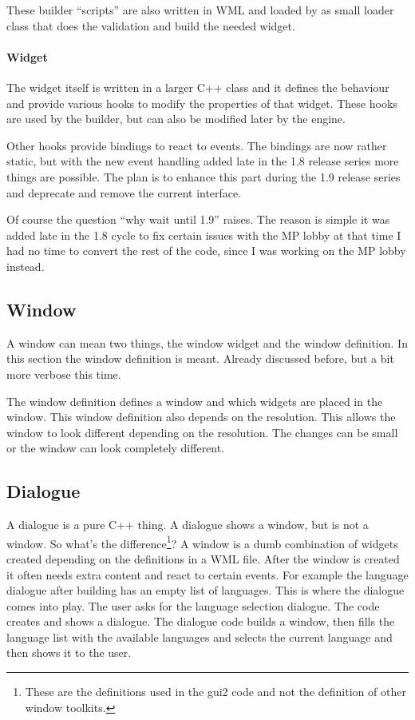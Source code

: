 \documentclass[a4paper,notitlepage]{report}
\begin{document}
These builder ``scripts'' are also written in WML and loaded by as small loader
class that does the validation and build the needed widget.

\paragraph{Widget}
The widget itself is written in a larger C++ class and it defines the behaviour
and provide various hooks to modify the properties of that widget. These hooks
are used by the builder, but can also be modified later by the engine.

Other hooks provide bindings to react to events. The bindings are now rather
static, but with the new event handling added late in the 1.8 release series
more things are possible. The plan is to enhance this part during the 1.9
release series and deprecate and remove the current interface.

Of course the question ``why wait until 1.9'' raises. The reason is simple it
was added late in the 1.8 cycle to fix certain issues with the MP lobby at that
time I had no time to convert the rest of the code, since I was working on the
MP lobby instead.

\subsection{Window}

A window can mean two things, the window widget and the window definition. In
this section the window definition is meant. Already discussed before, but a bit
more verbose this time.

The window definition defines a window and which widgets are placed in the
window. This window definition also depends on the resolution. This allows the
window to look different depending on the resolution. The changes can be small
or the window can look completely different.

\subsection{Dialogue}

A dialogue is a pure C++ thing. A dialogue shows a window, but is not a window.
So what's the difference\footnote{These are the definitions used in the gui2
code and not the definition of other window toolkits.}? A window is a dumb
combination of widgets created depending on the definitions in a WML file. After
the window is created it often needs extra content and react to certain events.
For example the language dialogue after building has an empty list of languages.
This is where the dialogue comes into play. The user asks for the language
selection dialogue. The code creates and shows a dialogue. The dialogue code
builds a window, then fills the language list with the available languages and
selects the current language and then shows it to the user.
\end{document}
